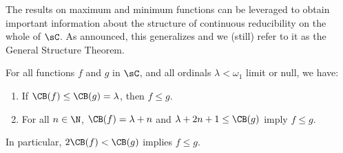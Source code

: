 The results on maximum and minimum functions can be leveraged to obtain important information about the structure of continuous reducibility on the whole of $\sC$.
As announced, this generalizes \cite[Theorem 5.2]{carroy2013quasi} and we (still) refer to it as the General Structure Theorem.



\begin{theorem}\label{JSLgeneralstructure}
For all functions $f$ and $g$ in $\sC$, and all ordinals $\lambda<\omega_1$ limit or null, we have:
\begin{enumerate}
\item If $\CB(f)\leq \CB(g)=\lambda$, then $f\leq g$.
\item For all $n\in \N$, $\CB(f)=\lambda+n$ and $\lambda+2n+1\leq \CB(g)$ imply $f\leq g$.
\end{enumerate}
In particular, $2\CB(f)<\CB(g)$ implies $f\leq g$.
\end{theorem}

